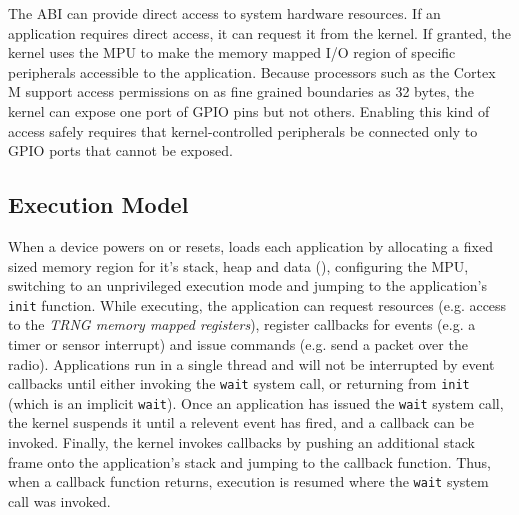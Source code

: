 The ABI can provide direct access to system hardware resources. If an 
application requires direct access, it can request it from the kernel.
If granted, the kernel uses the MPU to make the memory mapped I/O region
of specific peripherals accessible to the application. Because processors
such as the Cortex M support access permissions on as fine grained boundaries
as 32 bytes, the kernel can expose one port of GPIO pins but not others.
Enabling this kind of access safely requires that kernel-controlled
peripherals be connected only to GPIO ports that cannot be exposed.




\subsection{Execution Model}

When a device powers on or resets, \name loads each application by allocating a
fixed sized memory region for it's stack, heap and data
(), configuring the MPU, switching to an
unprivileged execution mode and jumping to the application's {\tt init}
function. While executing, the application can request resources (e.g. access to
the \emph{TRNG memory mapped registers}), register callbacks for events (e.g. a
timer or sensor interrupt) and issue commands (e.g. send a packet over the
radio). Applications run in a single thread and will not be interrupted by event
callbacks until either invoking the {\tt wait} system call, or returning from
{\tt init} (which is an implicit {\tt wait}). Once an application has issued the
{\tt wait} system call, the kernel suspends it until a relevent event has fired,
and a callback can be invoked. Finally, the kernel invokes callbacks by pushing
an additional stack frame onto the application's stack and jumping to the
callback function. Thus, when a callback function returns, execution is resumed
where the {\tt wait} system call was invoked.



